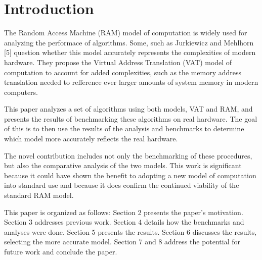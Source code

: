 \section{Introduction}
  
  The Random Access Machine (RAM) model of computation is widely used for
  analyzing the performace of algorithms. Some, such as Jurkiewicz and Mehlhorn
  [5] question whether this model accurately represents the complexities of
  modern hardware. They propose the Virtual Address Translation (VAT) model of
  computation to account for added complexities, such as the memory address
  translation needed to refference ever larger amounts of system memory in 
  modern computers.
  
  This paper analyzes a set of algorithms using both models, VAT and RAM,
  and presents the results of benchmarking these algorithms on real hardware.
  The goal of this is to then use the results of the analysis and benchmarks
  to determine which model more accurately reflects the real hardware.
  
  The novel contribution includes not only the benchmarking of these procedures,
  but also the comparative analysis of the two models. This work is significant
  because it could have shown the benefit to adopting a new model of
  computation into standard use and because it does confirm the continued
  viability of the standard RAM model.

  This paper is organized as follows: Section 2 presents the paper's
  motivation. Section 3 addresses previous work. Section 4 details how the
  benchmarks and analyses were done. Section 5 presents the results. Section 6
  discusses the results, selecting the more accurate model. Section 7 and 8 
  address the potential for future work and conclude the paper.